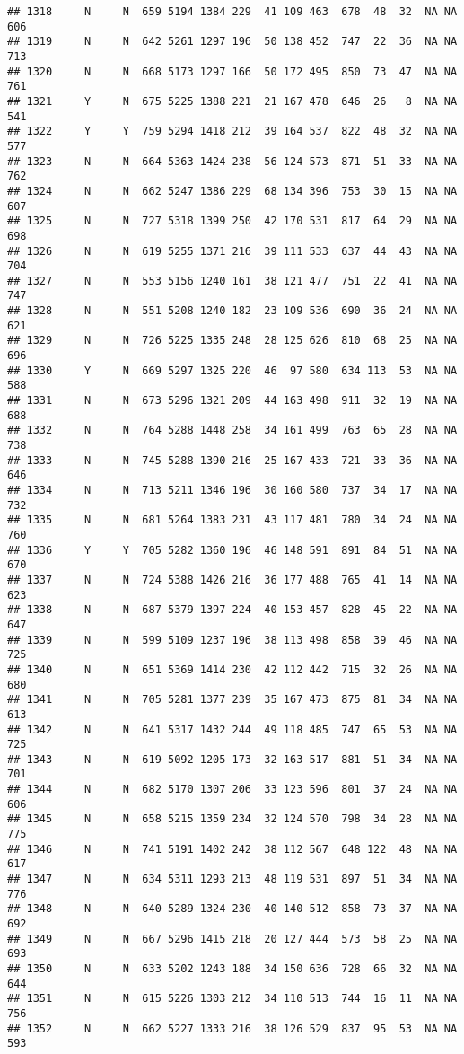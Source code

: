 \documentclass[]{article}
\begin{document}
\begin{verbatim}
## 1318     N     N  659 5194 1384 229  41 109 463  678  48  32  NA NA  606
## 1319     N     N  642 5261 1297 196  50 138 452  747  22  36  NA NA  713
## 1320     N     N  668 5173 1297 166  50 172 495  850  73  47  NA NA  761
## 1321     Y     N  675 5225 1388 221  21 167 478  646  26   8  NA NA  541
## 1322     Y     Y  759 5294 1418 212  39 164 537  822  48  32  NA NA  577
## 1323     N     N  664 5363 1424 238  56 124 573  871  51  33  NA NA  762
## 1324     N     N  662 5247 1386 229  68 134 396  753  30  15  NA NA  607
## 1325     N     N  727 5318 1399 250  42 170 531  817  64  29  NA NA  698
## 1326     N     N  619 5255 1371 216  39 111 533  637  44  43  NA NA  704
## 1327     N     N  553 5156 1240 161  38 121 477  751  22  41  NA NA  747
## 1328     N     N  551 5208 1240 182  23 109 536  690  36  24  NA NA  621
## 1329     N     N  726 5225 1335 248  28 125 626  810  68  25  NA NA  696
## 1330     Y     N  669 5297 1325 220  46  97 580  634 113  53  NA NA  588
## 1331     N     N  673 5296 1321 209  44 163 498  911  32  19  NA NA  688
## 1332     N     N  764 5288 1448 258  34 161 499  763  65  28  NA NA  738
## 1333     N     N  745 5288 1390 216  25 167 433  721  33  36  NA NA  646
## 1334     N     N  713 5211 1346 196  30 160 580  737  34  17  NA NA  732
## 1335     N     N  681 5264 1383 231  43 117 481  780  34  24  NA NA  760
## 1336     Y     Y  705 5282 1360 196  46 148 591  891  84  51  NA NA  670
## 1337     N     N  724 5388 1426 216  36 177 488  765  41  14  NA NA  623
## 1338     N     N  687 5379 1397 224  40 153 457  828  45  22  NA NA  647
## 1339     N     N  599 5109 1237 196  38 113 498  858  39  46  NA NA  725
## 1340     N     N  651 5369 1414 230  42 112 442  715  32  26  NA NA  680
## 1341     N     N  705 5281 1377 239  35 167 473  875  81  34  NA NA  613
## 1342     N     N  641 5317 1432 244  49 118 485  747  65  53  NA NA  725
## 1343     N     N  619 5092 1205 173  32 163 517  881  51  34  NA NA  701
## 1344     N     N  682 5170 1307 206  33 123 596  801  37  24  NA NA  606
## 1345     N     N  658 5215 1359 234  32 124 570  798  34  28  NA NA  775
## 1346     N     N  741 5191 1402 242  38 112 567  648 122  48  NA NA  617
## 1347     N     N  634 5311 1293 213  48 119 531  897  51  34  NA NA  776
## 1348     N     N  640 5289 1324 230  40 140 512  858  73  37  NA NA  692
## 1349     N     N  667 5296 1415 218  20 127 444  573  58  25  NA NA  693
## 1350     N     N  633 5202 1243 188  34 150 636  728  66  32  NA NA  644
## 1351     N     N  615 5226 1303 212  34 110 513  744  16  11  NA NA  756
## 1352     N     N  662 5227 1333 216  38 126 529  837  95  53  NA NA  593

\end{verbatim}
\end{document}
